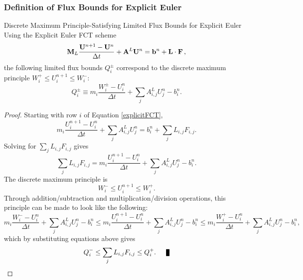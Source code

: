 \subsubsection{Definition of Flux Bounds for Explicit Euler}
\begin{theorem}{Discrete Maximum Principle-Satisfying Limited Flux Bounds for
  Explicit Euler}{}
   Using the Explicit Euler FCT scheme
   \begin{equation}\label{explicitFCT}
      \mathbf{M}_L\frac{\mathbf{U}^{n+1}-\mathbf{U}^n}{\Delta t}
         + \mathbf{A}^L\mathbf{U}^n
         = \mathbf{b}^n + \mathbf{L}\cdot\mathbf{F} \,,
   \end{equation}
   the following limited flux bounds $Q_i^\pm$ correspond to the discrete
   maximum principle $W_i^+\le U_i^{n+1}\le W_i^-$:
   \begin{equation}\label{Q_ex}
      Q_i^\pm \equiv m_i\frac{W_i^\pm-U_i^n}{\Delta t}
      + \sum\limits_j A_{i,j}^L U_j^n - b_i^n.
   \end{equation}
\end{theorem}

\begin{proof}
   Starting with row $i$ of Equation \eqref{explicitFCT},
   \[
      m_i\frac{U_i^{n+1}-U_i^n}{\Delta t}
      + \sum\limits_j A_{i,j}^L U_j^n
      = b_i^n + \sum\limits_j L_{i,j}F_{i,j}.
   \]
   Solving for $\sum\limits_j L_{i,j}F_{i,j}$ gives
   \[
      \sum\limits_j L_{i,j}F_{i,j} =
      m_i\frac{U_i^{n+1}-U_i^n}{\Delta t}
      + \sum\limits_j A_{i,j}^L U_j^n
      - b_i^n.
   \]
   The discrete maximum principle is
   \[
      W_i^-\le U_i^{n+1}\le W_i^+.
   \]
   Through addition/subtraction and multiplication/division operations, this
   principle can be made to look like the following:
   \[
   m_i\frac{W_i^- -U_i^n}{\Delta t}
      + \sum\limits_j A_{i,j}^L U_j^n
      - b_i^n
   \le m_i\frac{U_i^{n+1}-U_i^n}{\Delta t}
      + \sum\limits_j A_{i,j}^L U_j^n
      - b_i^n
   \le m_i\frac{W_i^+ -U_i^n}{\Delta t}
      + \sum\limits_j A_{i,j}^L U_j^n
      - b_i^n,
   \]
   which by substituting equations above gives
   \[
      Q_i^-\le\sum\limits_j L_{i,j}F_{i,j}\le Q_i^+.\qed
   \]
\end{proof}
